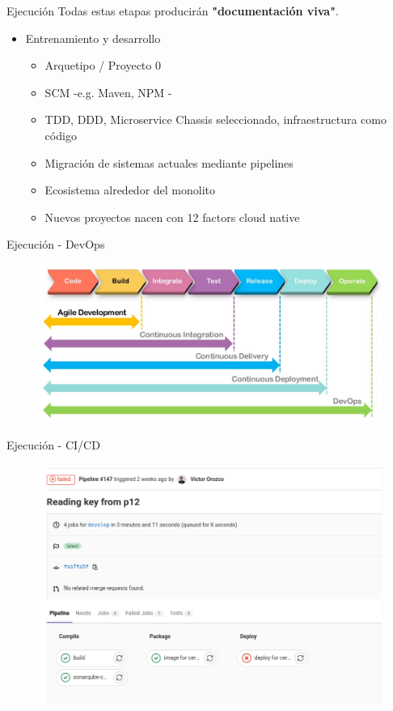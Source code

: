 \documentclass[aspectratio=169]{beamer}
\begin{document}
\begin{frame}{Ejecución}
Todas estas etapas producirán \textbf{"documentación viva"}.

\begin{itemize}

     \item  Entrenamiento y desarrollo
        \begin{itemize}
        \item Arquetipo / Proyecto 0
        \item SCM -e.g. Maven, NPM -
        \item TDD, DDD, Microservice Chassis seleccionado, infraestructura como código
        \item Migración de sistemas actuales mediante pipelines
        \item Ecosistema alrededor del monolito
        \item Nuevos proyectos nacen con 12 factors cloud native
        \end{itemize}
\end{itemize}

\end{frame}


\begin{frame}{Ejecución - DevOps}
\begin{figure}
	\centering
	\includegraphics[width=\linewidth]{Images/etapa1}
	\label{fig:etapa1}
\end{figure}
\end{frame}

\begin{frame}{Ejecución - CI/CD}
\begin{figure}
	\centering
	\includegraphics[width=0.8\linewidth]{Images/cicd}
\end{figure}
\end{frame}
\end{document}

